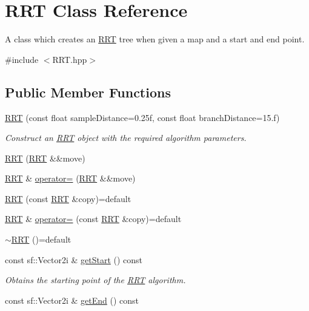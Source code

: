 \hypertarget{classRRT}{\section{R\+R\+T Class Reference}
\label{classRRT}
}


A class which creates an \hyperlink{classRRT}{R\+R\+T} tree when given a map and a start and end point.  




{\ttfamily \#include $<$R\+R\+T.\+hpp$>$}

\subsection*{Public Member Functions}
\begin{DoxyCompactItemize}
\item 
\hyperlink{classRRT_ab5a2cf5a9d8adb4077034047b7764c1b}{R\+R\+T} (const float sample\+Distance=0.\+25f, const float branch\+Distance=15.\+f)
\begin{DoxyCompactList}\small\item\em Construct an \hyperlink{classRRT}{R\+R\+T} object with the required algorithm parameters. \end{DoxyCompactList}\item 
\hyperlink{classRRT_ad5ead60ff7ffe318629226ee130d3e71}{R\+R\+T} (\hyperlink{classRRT}{R\+R\+T} \&\&move)
\item 
\hyperlink{classRRT}{R\+R\+T} \& \hyperlink{classRRT_ac93c18af76ce7b91b981daeac72146ce}{operator=} (\hyperlink{classRRT}{R\+R\+T} \&\&move)
\item 
\hyperlink{classRRT_a3636453ca77a4c95f0a9d0efffde30f7}{R\+R\+T} (const \hyperlink{classRRT}{R\+R\+T} \&copy)=default
\item 
\hyperlink{classRRT}{R\+R\+T} \& \hyperlink{classRRT_a94b62c34f8ada82dc56c620fdaf0a13c}{operator=} (const \hyperlink{classRRT}{R\+R\+T} \&copy)=default
\item 
\hyperlink{classRRT_af5f26f011cc50d90f7e93d6cd297920c}{$\sim$\+R\+R\+T} ()=default
\item 
const sf\+::\+Vector2i \& \hyperlink{classRRT_ad3cf3f119687f64b14ad5234daae3dc5}{get\+Start} () const 
\begin{DoxyCompactList}\small\item\em Obtains the starting point of the \hyperlink{classRRT}{R\+R\+T} algorithm. \end{DoxyCompactList}\item 
const sf\+::\+Vector2i \& \hyperlink{classRRT_a320e5980cb9a3a8e4a422b03bff1da73}{get\+End} () const 

\end{DoxyCompactItemize}
